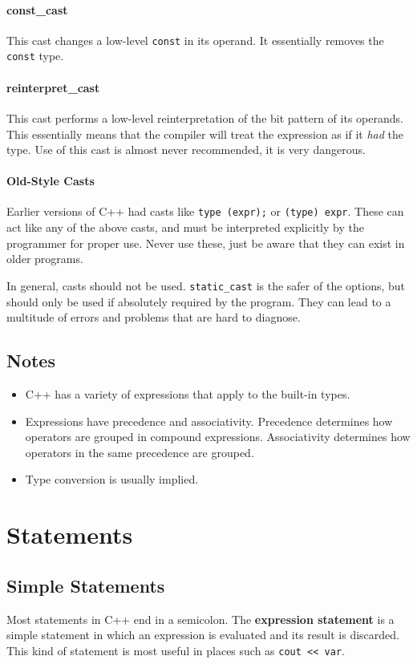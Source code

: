 \documentclass[12pt, a4paper]{report}
\begin{document}
\subsubsection{const\_cast}
This cast changes a low-level \verb|const| in its operand.
It essentially removes the \verb|const| type.
\subsubsection{reinterpret\_cast}
This cast performs a low-level reinterpretation of the bit pattern of its operands.
This essentially means that the compiler will treat the expression as if it \emph{had} the type.
Use of this cast is almost never recommended, it is very dangerous.
\subsubsection{Old-Style Casts}
Earlier versions of C++ had casts like \verb|type (expr);| or \verb|(type) expr|.
These can act like any of the above casts, and must be interpreted explicitly by the programmer for proper use.
Never use these, just be aware that they can exist in older programs.

In general, casts should not be used.
\verb|static_cast| is the safer of the options, but should only be used if absolutely required by the program.
They can lead to a multitude of errors and problems that are hard to diagnose.

\section{Notes}
\begin{itemize}
  \item C++ has a variety of expressions that apply to the built-in types. 
  \item Expressions have precedence and associativity. 
    Precedence determines how operators are grouped in compound expressions.
    Associativity determines how operators in the same precedence are grouped.
  \item Type conversion is usually implied.
\end{itemize}
\chapter{Statements}
\section{Simple Statements}
Most statements in C++ end in a semicolon.
The \textbf{expression statement} is a simple statement in which an expression is evaluated and its result is discarded.
This kind of statement is most useful in places such as \verb|cout << var|.
\end{document}
